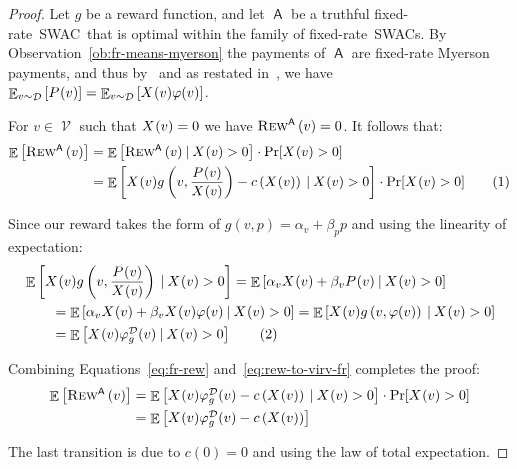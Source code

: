 \documentclass[11pt,letterpaper]{article}
\newcommand{\sqbr}[1]{\left[ #1 \right]}
\newcommand{\brackets}[1]{\left( #1 \right)}
\newcommand{\fr}{fixed-rate\xspace}
\newcommand{\swac}{SWAC\xspace}
\newcommand{\swacs}{SWACs\xspace}
\DeclareMathOperator*{\E}{\bb{E}}
\newcommand{\given}{\medspace | \medspace}
\newcommand\numberthis{\addtocounter{equation}{1}\tag{\theequation}}
\newcommand{\bb}[1]{\mathbb{#1}}
\DeclareMathOperator{\A}{\auc{A}}
\DeclareMathOperator{\D}{\mathcal{D}}
\DeclareMathOperator{\V}{\mathcal{V}}
\newcommand{\g}{g}
\theoremstyle{plain}
\newcommand{\auc}[1]{\mathsf{#1}}
\begin{document}
\begin{proof}
    Let $\g$ be a reward function, and let $\A$ be a truthful \fr\ \swac\ that is optimal within the family of \fr\ \swacs. 
    By Observation~\ref{ob:fr-means-myerson} the payments of $\A$ are \fr Myerson payments, and thus by~\cite{myerson1981optimal} and as restated in~\cite[Chapter 3]{hartline2013mechanism}, we have $\E_{v\sim\D}\sqbr{\p{v}}=\E_{v\sim\D}\sqbr{\x{v}\varphi(v)}$.

    For $v\in\V$ such that $\x{v}=0$ we have $\trew[\A]{v}=0$. It follows that:
    \begin{align*}
        \E\sqbr{\trew[\A]{v}}&= \E\sqbr{\trew[\A]{v}\given\x{v}>0}\cdot\Pr[\x{v}>0]\\
        &=\E\sqbr{\x{v}\g\brackets{v,\frac{\p{v}}{\x{v}}}-c\brackets{\x{v}}\given\x{v}>0}\cdot\Pr[\x{v}>0]\numberthis\label{eq:fr-rew}
    \end{align*}

    Since our reward takes the form of $\g(v,p)=\alpha_v+\beta_p p$ and using the linearity of expectation:
    \begin{align*}
        &\E\sqbr{\x{v}\g\brackets{v,\frac{\p{v}}{\x{v}}}\given\x{v}>0}=\E\sqbr{\alpha_v\x{v}+\beta_v\p{v}\given\x{v}>0}\\
        &\quad\quad=\E\sqbr{\alpha_v\x{v}+\beta_v\x{v}\varphi(v)\given\x{v}>0}
        =\E\sqbr{\x{v}\g\brackets{v,\varphi(v)}\given\x{v}>0}\\
        &\quad\quad=\E\sqbr{\x{v}\varphi_{\g}^{\D}(v)\given\x{v}>0}\numberthis\label{eq:rew-to-virv-fr}
    \end{align*}

    Combining Equations~\ref{eq:fr-rew} and~\ref{eq:rew-to-virv-fr} completes the proof:
    \begin{align*}
        \E\sqbr{\trew[\A]{v}}&= \E\sqbr{\x{v}\varphi_{\g}^{\D}(v)-c\brackets{\x{v}}\given\x{v}>0}\cdot\Pr[\x{v}>0]\\
        &=\E\sqbr{\x{v}\varphi_{\g}^{\D}(v)-c\brackets{\x{v}}}
    \end{align*}

    The last transition is due to $c(0)=0$ and using the law of total expectation.
\end{proof}
\end{document}
